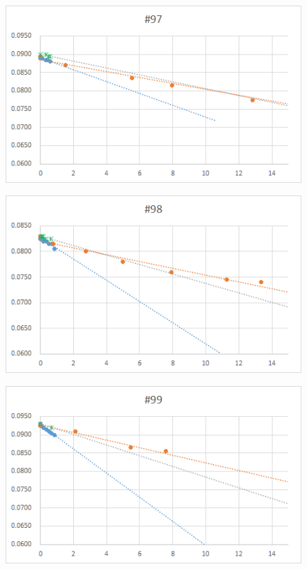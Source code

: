   \begin{figure}[htbp]
    \centering
       \includegraphics[width=120mm]{vol_097.png}
  \end{figure}
  \begin{figure}[htbp]
    \centering
       \includegraphics[width=120mm]{vol_098.png}
  \end{figure}
  \begin{figure}[htbp]
    \centering
       \includegraphics[width=120mm]{vol_099.png}
  \end{figure}
